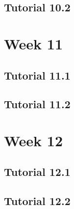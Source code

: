 \documentclass{article}
\begin{document}
\begin{multicols}{2}
\subsection{Tutorial 10.2}
\section{Week 11}
\subsection{Tutorial 11.1}
\subsection{Tutorial 11.2}
\section{Week 12}
\subsection{Tutorial 12.1}
\subsection{Tutorial 12.2}

\end{multicols}
\end{document}
